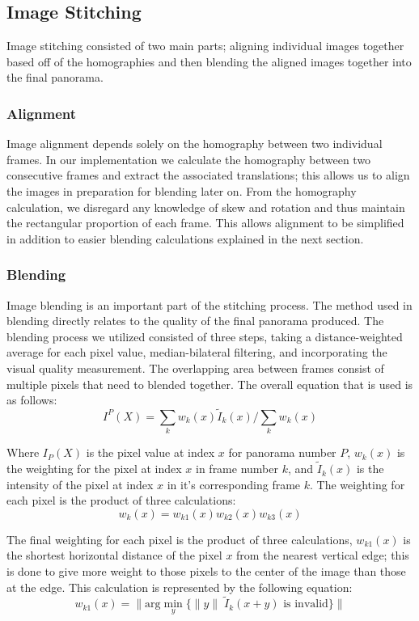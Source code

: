 \subsection{Image Stitching}
Image stitching consisted of two main parts; aligning individual images together based off of the homographies 
and then blending the aligned images together into the final panorama. 

\subsubsection{Alignment}
Image alignment depends solely on the homography between two individual frames. In our implementation we 
calculate the homography between two consecutive frames and extract the associated translations; this allows
us to align the images in preparation for blending later on. From the homography calculation, we disregard
any knowledge of skew and rotation and thus maintain the rectangular proportion of each frame. This allows 
alignment to be simplified in addition to easier blending calculations explained in the next section.

\subsubsection{Blending}
Image blending is an important part of the stitching process. The method used in blending directly relates to
the quality of the final panorama produced. The blending process we utilized consisted of three steps, taking
a distance-weighted average for each pixel value, median-bilateral filtering, and incorporating the visual 
quality measurement. The overlapping area between frames consist of multiple pixels that need to blended 
together. The overall equation that is used is as follows:
\begin{equation}
I^P(X)=\displaystyle\sum_{k} w_k(x)\tilde{I}_k(x)/\displaystyle\sum_{k} w_k(x)
\end{equation}

Where $I_P(X)$ is the pixel value at index $x$ for panorama number $P$, $w_k(x)$ is the weighting for the 
pixel at index $x$ in frame number $k$, and $\tilde{I}_k(x)$ is the intensity of the pixel at index $x$ in 
it's corresponding frame $k$. The weighting for each pixel is the product of three calculations:
\begin{equation}
w_k(x) = w_{k1}(x)w_{k2}(x)w_{k3}(x)
\end{equation}

The final weighting for each pixel is the product of three calculations, $w_{k1}(x)$ is the shortest horizontal 
distance of the pixel $x$ from the nearest vertical edge; this is done to give more weight to those pixels to 
the center of the image than those at the edge. This calculation is represented by the following equation:
\begin{equation}
w_{k1}(x) =  \| \text{arg} \displaystyle\min_{y}\{\|y\|\; \tilde{I}_k (x+y) \text{ is invalid} \}\|
\end{equation}

